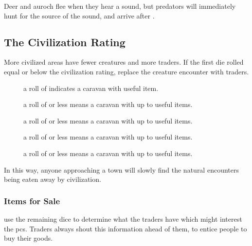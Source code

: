\begin{multicols}{2}
Deer and auroch flee when they hear a sound, but predators will immediately hunt for the source of the sound, and arrive after .

\subsection{The Civilization Rating}
\label{civilizationRating}

More civilized areas have fewer creatures and more traders.
If the first die rolled equal or below the civilization rating, replace the creature encounter with traders.

\setcounter{encnum}{1}
\begin{description}
  \item[\encCivilization] a roll of \dicef{\value{encnum}} indicates a caravan with  useful item.

  \item[\encCivilization]
  a roll of \dicef{\value{encnum}} or less means a caravan with up to  useful items.

  \item[\encCivilization]
  a roll of \dicef{\value{encnum}} or less means a caravan with up to  useful items.

  \item[\encCivilization]
  a roll of \dicef{\value{encnum}} or less means a caravan with up to  useful items.

  \item[\encCivilization]
  a roll of \dicef{\value{encnum}} or less means a caravan with up to  useful items.
\end{description}

In this way, anyone approaching a town will slowly find the natural encounters being eaten away by civilization.

\subsubsection{Items for Sale}
\label{traders}
use the remaining dice to determine what the traders have which might interest the \glspl{pc}.
Traders always shout this information ahead of them, to entice people to buy their goods.

\encTraders


\end{multicols}

